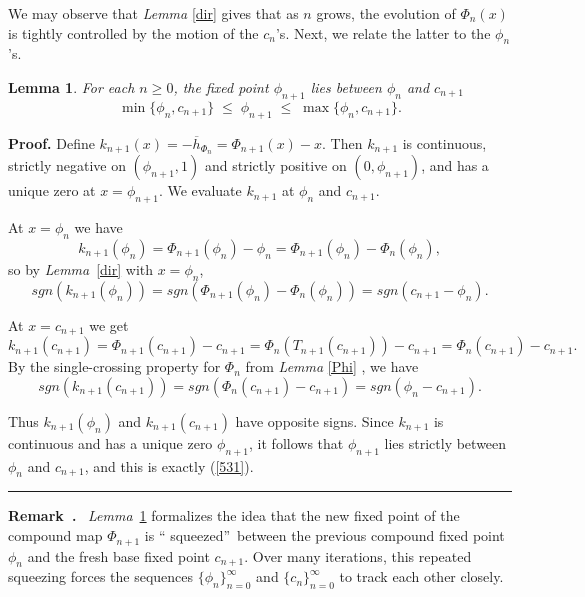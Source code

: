 \documentclass[onecolumn]{article}
\newtheorem{lemma}[theorem]{Lemma}
\newenvironment{remark}{  \refstepcounter{theorem}  \par\medskip\noindent\textbf{Remark~\thetheorem.}\rmfamily\ }{\par\medskip}
\newenvironment{proof}[1][Proof]{\noindent\textbf{#1.} }{\ \rule{0.5em}{0.5em}}
\begin{document}
We may observe that \textit{Lemma} \ref{dir} gives that as $n$ grows, the
evolution of $\Phi _{n}(x)$ is tightly controlled by the motion of the $%
c_{n} $'s. Next, we relate the latter to the $\phi _{n}$'s.

\begin{lemma}
\label{alignment} For each $n\geq 0$, the fixed point $\phi _{n+1}$ lies
between $\phi _{n}$ and $c_{n+1}$ 
\begin{equation}
\min \{\phi _{n},c_{n+1}\}\;\leq \;\phi _{n+1}\;\leq \;\max \{\phi
_{n},c_{n+1}\}.  \label{531}
\end{equation}
\end{lemma}

\begin{proof}
Define $k_{n+1}(x)=-\overline{h}_{\Phi _{n}}=\Phi _{n+1}(x)-x$. Then $%
k_{n+1} $ is continuous, strictly negative on $(\phi _{n+1},1)$ and strictly
positive on $(0,\phi _{n+1})$, and has a unique zero at $x=\phi _{n+1}$. We
evaluate $k_{n+1}$ at $\phi _{n}$ and $c_{n+1}$.

At $x=\phi _{n}$ we have 
\begin{equation}
k_{n+1}(\phi _{n})=\Phi _{n+1}(\phi _{n})-\phi _{n}=\Phi _{n+1}(\phi
_{n})-\Phi _{n}(\phi _{n}),  \label{532}
\end{equation}%
so by \textit{Lemma}~\ref{dir} with $x=\phi _{n}$, 
\begin{equation}
sgn(k_{n+1}(\phi _{n}))=sgn(\Phi _{n+1}(\phi _{n})-\Phi _{n}(\phi
_{n}))=sgn(c_{n+1}-\phi _{n}).  \label{533}
\end{equation}

At $x=c_{n+1}$ we get 
\begin{equation}
k_{n+1}(c_{n+1})=\Phi _{n+1}(c_{n+1})-c_{n+1}=\Phi
_{n}(T_{n+1}(c_{n+1}))-c_{n+1}=\Phi _{n}(c_{n+1})-c_{n+1}.  \label{534}
\end{equation}%
By the single-crossing property for $\Phi _{n}$ from \textit{Lemma} \ref{Phi}%
, we have 
\begin{equation}
sgn(k_{n+1}(c_{n+1}))=sgn(\Phi _{n}(c_{n+1})-c_{n+1})=sgn(\phi _{n}-c_{n+1}).
\label{535}
\end{equation}

Thus $k_{n+1}(\phi _{n})$ and $k_{n+1}(c_{n+1})$ have opposite signs. Since $%
k_{n+1}$ is continuous and has a unique zero $\phi _{n+1}$, it follows that $%
\phi _{n+1}$ lies strictly between $\phi _{n}$ and $c_{n+1}$, and this is
exactly (\ref{531}).
\end{proof}

\begin{remark}
\textit{Lemma}~\ref{alignment} formalizes the idea that the new fixed point
of the compound map $\Phi _{n+1}$ is \textquotedblleft
squeezed\textquotedblright\ between the previous compound fixed point $\phi
_{n}$ and the fresh base fixed point $c_{n+1}$. Over many iterations, this
repeated squeezing forces the sequences $\{\phi _{n}\}_{n=0}^{\infty }$ and $%
\{c_{n}\}_{n=0}^{\infty }$ to track each other closely.
\end{remark}
\end{document}
